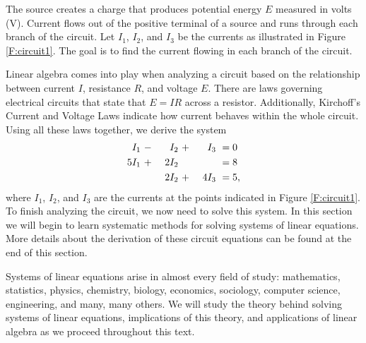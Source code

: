 The source creates a charge that produces potential energy $E$ measured in volts (V).  Current flows out of the positive terminal of a source and runs through each branch of the circuit. Let $I_1$, $I_2$, and $I_3$ be the currents as illustrated in  Figure \ref{F:circuit1}. The goal is to find the current flowing in each branch of the circuit.  

Linear algebra comes into play when analyzing a circuit based on the relationship between current $I$, resistance $R$, and voltage $E$. There are laws governing electrical circuits that state that $E = IR$ across a resistor. Additionally, Kirchoff's Current and Voltage Laws indicate how current behaves within the whole circuit. Using all these laws together, we derive the system
\begin{alignat}{4}
{}I_1 \	&- \	&{}I_2 \	&+ \	&{}I_3 \	&= 0  \notag \\ %
5I_1 \	&+ \	&2I_2 \		&{} \ 	&{}  \		&= 8 \notag \\ %
	\	&{} \ 	&2I_2 \		&+ \	&4I_3 \		&= 5, \notag %
\end{alignat}
where $I_1$, $I_2$, and $I_3$ are the currents at the points indicated in Figure \ref{F:circuit1}. To finish analyzing the circuit, we now need to solve this system. In this section we will begin to learn systematic methods for solving systems of linear equations. More details about the derivation of these circuit equations can be found at the end of this section.  

\label{sec:intro_le_intro}

Systems of linear equations  arise in almost every field of study: mathematics, statistics, physics, chemistry, biology, economics, sociology, computer science, engineering, and many, many others. We will study the theory behind solving systems of linear equations, implications of this theory, and applications of linear algebra as we proceed throughout this text. 

